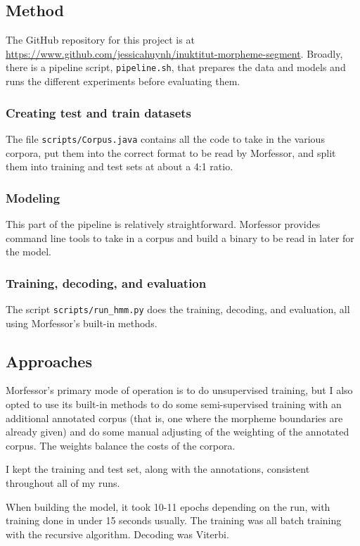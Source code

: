 \documentclass[10pt]{article}
\begin{document}
\subsection{Method}
The GitHub repository for this project is at \url{https://www.github.com/jessicahuynh/inuktitut-morpheme-segment}. Broadly, there is a pipeline script, \texttt{pipeline.sh}, that prepares the data and models and runs the different experiments before evaluating them.

\subsubsection{Creating test and train datasets}
The file \texttt{scripts/Corpus.java} contains all the code to take in the various corpora, put them into the correct format to be read by Morfessor, and split them into training and test sets at about a 4:1 ratio.

\subsubsection{Modeling}
This part of the pipeline is relatively straightforward. Morfessor provides command line tools to take in a corpus and build a binary to be read in later for the model.

\subsubsection{Training, decoding, and evaluation}
The script \texttt{scripts/run\_hmm.py} does the training, decoding, and evaluation, all using Morfessor's built-in methods.

\subsection{Approaches}
Morfessor's primary mode of operation is to do unsupervised training, but I also opted to use its built-in methods to do some semi-supervised training with an additional annotated corpus (that is, one where the morpheme boundaries are already given) and do some manual adjusting of the weighting of the annotated corpus. The weights balance the costs of the corpora.

I kept the training and test set, along with the annotations, consistent throughout all of my runs.

When building the model, it took 10-11 epochs depending on the run, with training done in under 15 seconds usually. The training was all batch training with the recursive algorithm. Decoding was Viterbi.
\end{document}

